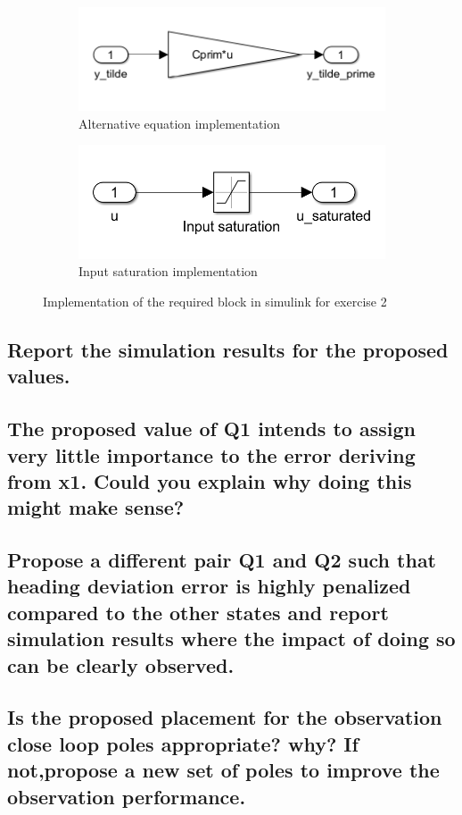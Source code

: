 \begin{figure}[H]
\begin{subfigure}[b]{0.45\textwidth}
         \centering
         \includegraphics[width=\textwidth]{Latex report/image/ex2altEq.png}
         \caption{Alternative equation implementation}
         \label{fig:altEqSim}
     \end{subfigure}
     \begin{subfigure}[b]{0.45\textwidth}
         \centering
         \includegraphics[width=\textwidth]{Latex report/image/ex2Saturation.png}
         \caption{Input saturation implementation}
         \label{fig:simSat}
     \end{subfigure}
    \caption{Implementation of the required block in simulink for exercise 2}
    \label{fig:simImplEx2}
\end{figure}

\subsection{Report the simulation results for the proposed values.}


\subsection{The proposed value of Q1 intends to assign very little importance to the error deriving from x1. Could you explain why doing this might make sense?}


\subsection{Propose a different pair Q1 and Q2 such that heading deviation error is highly penalized compared to the other states and report simulation results where the impact of doing so can be clearly observed.}


\subsection{Is the proposed placement for the observation close loop poles appropriate? why? If not,propose a new set of poles to improve the observation performance.}